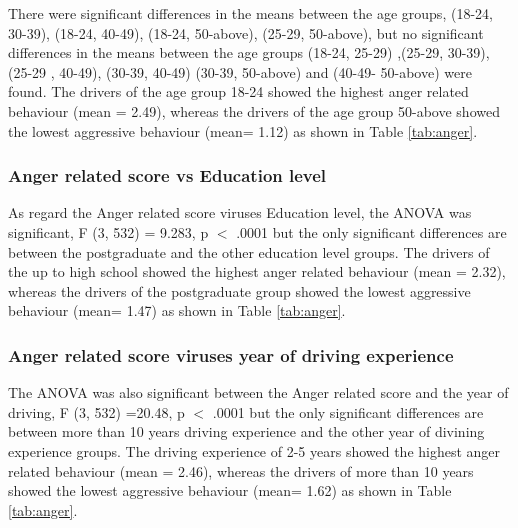\documentclass[preprint,12pt,a4paper,authoryear]{elsarticle}
\begin{document}
There were significant differences in the means between the age groups, (18-24, 30-39), (18-24, 40-49), (18-24, 50-above), (25-29, 50-above), but no significant differences in the means between the age groups (18-24, 25-29) ,(25-29, 30-39), (25-29 , 40-49), (30-39, 40-49)  (30-39, 50-above)  and (40-49- 50-above)  were found. The drivers of the age group 18-24 showed the highest anger related behaviour (mean = 2.49), whereas the drivers of the age group 50-above showed the lowest aggressive behaviour (mean= 1.12) as shown in Table \ref{tab:anger}.

\subsubsection{Anger related score vs Education level}

As regard the Anger related score viruses Education level, the ANOVA was significant, F (3, 532) = 9.283, p $<$ .0001 but the only significant differences are between the postgraduate and the other education level groups. The drivers of the up to high school showed the highest anger related behaviour (mean = 2.32), whereas the drivers of the postgraduate group showed the lowest aggressive behaviour (mean= 1.47) as shown in Table \ref{tab:anger}.

\subsubsection{Anger related score viruses year of driving experience}
The ANOVA was also significant between the Anger related score and the year of driving, F (3, 532) =20.48, p $<$ .0001 but the only significant differences are between more than 10 years driving experience and  the other year of divining experience groups. The driving experience of 2-5 years showed the highest anger related behaviour (mean = 2.46), whereas the drivers of more than 10 years showed the lowest aggressive behaviour (mean= 1.62) as shown in Table \ref{tab:anger}.
\end{document}
